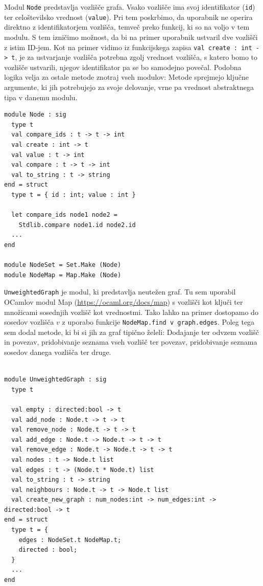 \documentclass[mat1, tisk]{fmfdelo}
\begin{document}
Modul \texttt{Node} predstavlja vozlišče grafa. 
Vsako vozlišče ima svoj identifikator (\texttt{id}) ter celoštevilsko vrednost (\texttt{value}). Pri tem poskrbimo, da uporabnik ne 
operira direktno z identifikatorjem vozlišča, temveč preko funkcij, ki so na voljo v tem modulu.
S tem izničimo možnost, da bi na primer uporabnik ustvaril dve vozlišči z istim ID-jem. 
Kot na primer vidimo iz funkcijskega zapisa \texttt{val create : int -> t}, je za ustvarjanje vozlišča potrebna
zgolj vrednost vozlišča, s katero bomo to vozlišče ustvarili, njegov identifikator pa se bo samodejno povečal.
Podobna logika velja za ostale metode znotraj vseh modulov: Metode sprejmejo ključne argumente, ki jih potrebujejo
za svoje delovanje, vrne pa vrednost abstraktnega tipa v danemu modulu.

\begin{lstlisting}
module Node : sig
  type t
  val compare_ids : t -> t -> int
  val create : int -> t
  val value : t -> int
  val compare : t -> t -> int
  val to_string : t -> string
end = struct
  type t = { id : int; value : int }

  let compare_ids node1 node2 = 
    Stdlib.compare node1.id node2.id
  ...
end

module NodeSet = Set.Make (Node)
module NodeMap = Map.Make (Node)

\end{lstlisting}

\texttt{UnweightedGraph} je modul, ki predstavlja neutežen graf. 
Tu sem uporabil OCamlov modul Map (\url{https://ocaml.org/docs/map}) s vozlišči kot ključi ter množicami sosednjih vozlišč
kot vrednostmi. Tako lahko na primer dostopamo do sosedov vozlišča $v$ z uporabo funkcije \texttt{NodeMap.find v graph.edges}.
Poleg tega sem dodal metode, ki bi si jih za graf tipično želeli: Dodajanje ter odvzem
vozlišč in povezav, pridobivanje seznama vseh vozlišč ter povezav, pridobivanje seznama sosedov danega vozlišča
ter druge.

\begin{lstlisting}

module UnweightedGraph : sig
  type t

  val empty : directed:bool -> t
  val add_node : Node.t -> t -> t
  val remove_node : Node.t -> t -> t
  val add_edge : Node.t -> Node.t -> t -> t
  val remove_edge : Node.t -> Node.t -> t -> t
  val nodes : t -> Node.t list
  val edges : t -> (Node.t * Node.t) list
  val to_string : t -> string
  val neighbours : Node.t -> t -> Node.t list
  val create_new_graph : num_nodes:int -> num_edges:int -> directed:bool -> t
end = struct
  type t = {
    edges : NodeSet.t NodeMap.t;
    directed : bool;
  }
  ...
end

\end{lstlisting}
\end{document}
